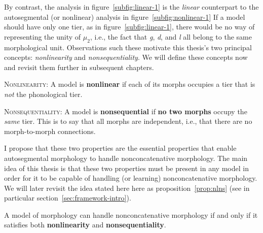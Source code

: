 By contrast, the analysis in figure~\ref{subfig:linear-1} is the \emph{linear} counterpart to the autosegmental  (or nonlinear) analysis in figure~\ref{subfig:nonlinear-1}
If a model should have only one tier, as in 
figure~\ref{subfig:linear-1}, there would be no way of representing the
unity of $\mu_2$, i.e., the fact that \textit{g}, \textit{d}, and \textit{l}
all belong to the same morphological unit. Observations such these motivate this thesis's two principal concepts: \emph{nonlinearity} and \emph{nonsequentiality}. We will define these concepts now and revisit them further in subsequent chapters. 

	\begin{definition}\label{def:nl}{\textsc{Nonlinearity}}: %
	A model is \textbf{nonlinear} if each of its morphs occupies a tier that is \emph{not} the phonological tier.
	\end{definition}
	\begin{definition}\label{def:ns}{\textsc{Nonsequentiality}}: %
	A model is \textbf{nonsequential} if \textbf{no two morphs} occupy the \emph{same} tier. This is to say that all morphs are independent, i.e., that there are no morph-to-morph connections.
	\end{definition}
I propose that these two properties are the essential properties that enable autosegmental morphology to handle nonconcatenative morphology. The main idea of this thesis is that these two properties must be present in any model in order for it to be capable of handling (or learning) nonconcatenative morphology.  We will later revisit the idea stated here here as proposition~\ref{prop:nlns} (see in particular section~\ref{sec:framework-intro}).
\begin{proposition}\label{prop:nlns}
A model of morphology can handle nonconcatenative morphology if and only if it satisfies both \textbf{nonlinearity} and \textbf{nonsequentiality}. %
\end{proposition}
